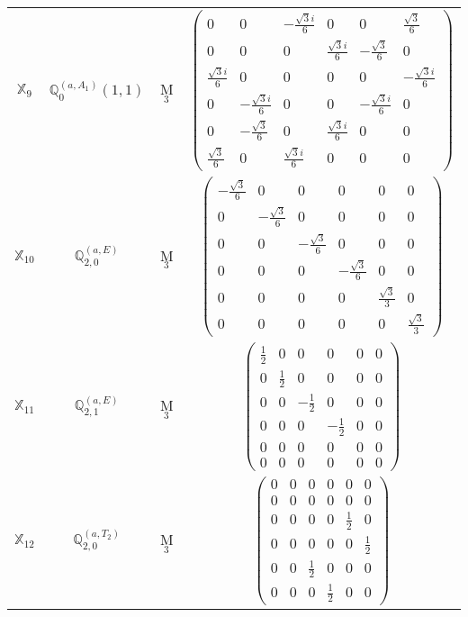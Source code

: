 \documentclass[fleqn,10pt,landscape]{article}
\begin{document}
\begin{itemize}
\begin{center}
\begin{longtable}{c|c|c|c}
$ \mathbb{X}_{9} $ & $\mathbb{Q}_{0}^{(a,A_{1})}(1,1)$ & M$_{3}$ & $\begin{pmatrix} 0 & 0 & - \frac{\sqrt{3} i}{6} & 0 & 0 & \frac{\sqrt{3}}{6} \\ 0 & 0 & 0 & \frac{\sqrt{3} i}{6} & - \frac{\sqrt{3}}{6} & 0 \\ \frac{\sqrt{3} i}{6} & 0 & 0 & 0 & 0 & - \frac{\sqrt{3} i}{6} \\ 0 & - \frac{\sqrt{3} i}{6} & 0 & 0 & - \frac{\sqrt{3} i}{6} & 0 \\ 0 & - \frac{\sqrt{3}}{6} & 0 & \frac{\sqrt{3} i}{6} & 0 & 0 \\ \frac{\sqrt{3}}{6} & 0 & \frac{\sqrt{3} i}{6} & 0 & 0 & 0 \end{pmatrix}$ \\
$ \mathbb{X}_{10} $ & $\mathbb{Q}_{2,0}^{(a,E)}$ & M$_{3}$ & $\begin{pmatrix} - \frac{\sqrt{3}}{6} & 0 & 0 & 0 & 0 & 0 \\ 0 & - \frac{\sqrt{3}}{6} & 0 & 0 & 0 & 0 \\ 0 & 0 & - \frac{\sqrt{3}}{6} & 0 & 0 & 0 \\ 0 & 0 & 0 & - \frac{\sqrt{3}}{6} & 0 & 0 \\ 0 & 0 & 0 & 0 & \frac{\sqrt{3}}{3} & 0 \\ 0 & 0 & 0 & 0 & 0 & \frac{\sqrt{3}}{3} \end{pmatrix}$ \\
$ \mathbb{X}_{11} $ & $\mathbb{Q}_{2,1}^{(a,E)}$ & M$_{3}$ & $\begin{pmatrix} \frac{1}{2} & 0 & 0 & 0 & 0 & 0 \\ 0 & \frac{1}{2} & 0 & 0 & 0 & 0 \\ 0 & 0 & - \frac{1}{2} & 0 & 0 & 0 \\ 0 & 0 & 0 & - \frac{1}{2} & 0 & 0 \\ 0 & 0 & 0 & 0 & 0 & 0 \\ 0 & 0 & 0 & 0 & 0 & 0 \end{pmatrix}$ \\
$ \mathbb{X}_{12} $ & $\mathbb{Q}_{2,0}^{(a,T_{2})}$ & M$_{3}$ & $\begin{pmatrix} 0 & 0 & 0 & 0 & 0 & 0 \\ 0 & 0 & 0 & 0 & 0 & 0 \\ 0 & 0 & 0 & 0 & \frac{1}{2} & 0 \\ 0 & 0 & 0 & 0 & 0 & \frac{1}{2} \\ 0 & 0 & \frac{1}{2} & 0 & 0 & 0 \\ 0 & 0 & 0 & \frac{1}{2} & 0 & 0 \end{pmatrix}$ \\

\end{longtable}
\end{center}
\end{itemize}
\end{document}
